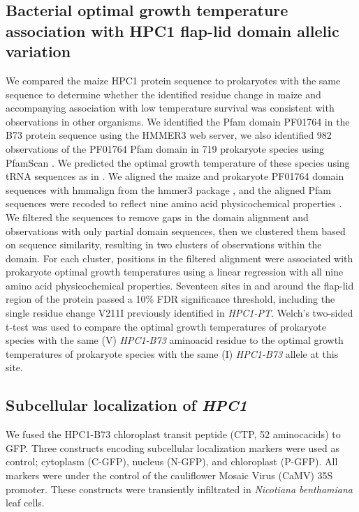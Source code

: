 \documentclass[9pt,twocolumn,twoside,lineno]{biorxiv}
\newcommand{\hpc}{\textit{HPC1}\xspace}
\begin{document}
\subsection{Bacterial optimal growth temperature association with HPC1 flap-lid domain allelic variation}
We compared the maize HPC1 protein sequence to prokaryotes with the same sequence to determine whether the identified residue change in maize and accompanying association with low temperature survival was consistent with observations in other organisms. 
We identified the Pfam domain PF01764 in the B73 protein sequence using the HMMER3 web server, we also identified 982 observations of the PF01764 Pfam domain in 719 prokaryote species using PfamScan \cite{Potter2018-tk, El-Gebali2019-pw}. 
We predicted the optimal growth temperature of these species using tRNA sequences as in \cite{Cimen2020-dm}. 
We aligned the maize and prokaryote PF01764 domain sequences with hmmalign from the hmmer3 package \cite{Eddy2011-pd}, and the aligned Pfam sequences were recoded to reflect nine amino acid physicochemical properties \cite{Li2016-ut}. 
We filtered the sequences to remove gaps in the domain alignment and observations with only partial domain sequences, then we clustered them based on sequence similarity, resulting in two clusters of observations within the domain. 
For each cluster, positions in the filtered alignment were associated with prokaryote optimal growth temperatures using a linear regression with all nine amino acid physicochemical properties. 
Seventeen sites in and around the flap-lid region of the protein passed a 10\% FDR significance threshold, including the single residue change V211I previously identified in \textit{HPC1-PT}. 
Welch’s two-sided t-test was used to compare the optimal growth temperatures of prokaryote species with the same (V) \textit{HPC1-B73} aminoacid residue to the optimal growth temperatures of prokaryote species with the same (I) \textit{HPC1-B73} allele at this site.
\subsection{Subcellular localization of \hpc}
We fused the HPC1-B73 chloroplast transit peptide (CTP, 52 aminocacids) to GFP. 
Three constructs encoding subcellular localization markers were used as control; cytoplasm (C-GFP), nucleus (N-GFP), and chloroplast (P-GFP).
All markers were under the control of the cauliflower Mosaic Virus (CaMV) 35S promoter. 
These constructs were transiently infiltrated in \textit{Nicotiana benthamiana} leaf cells.
\end{document}
